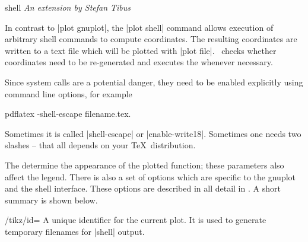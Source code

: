 {\begin{addplotoperation}[]{shell}{}
{\small \emph{An extension by Stefan Tibus}}

In contrast to |plot gnuplot|, the |plot shell| command allows execution of arbitrary shell commands to compute coordinates. The resulting coordinates are written to a text file which will be plotted with |plot file|. \PGF\ checks whether coordinates need to be re-generated and executes the  whenever necessary.

Since system calls are a potential danger, they need to be enabled explicitly using command line options, for example
\begin{codeexample}
pdflatex -shell-escape filename.tex.
\end{codeexample}
Sometimes it is called |shell-escape| or |enable-write18|. Sometimes one needs two slashes -- that all depends on your \TeX\ distribution.
\begin{codeexample}[]
\end{codeexample}

\begin{codeexample}[]
\end{codeexample}

The  determine the appearance of the plotted function; these parameters also affect the legend. There is also a set of options which are specific to the gnuplot and the shell interface. These options are described in all detail in \cite[section~19.6]{tikz}. A short summary is shown below.
\end{addplotoperation}

\begin{key}{/tikz/id=}
	 A unique identifier for the current plot. It is used to generate temporary filenames for |shell| output.
\end{key}

}

